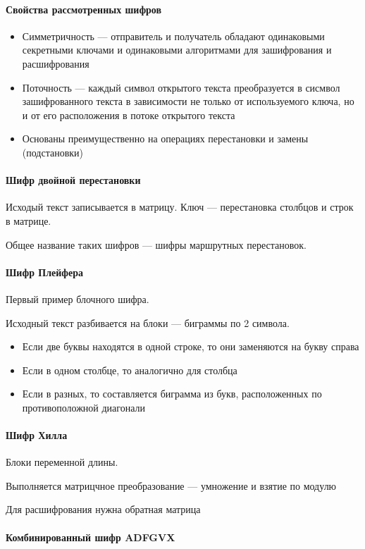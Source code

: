 \documentclass[a4paper, 14pt]{extarticle}
\begin{document}
\paragraph{Свойства рассмотренных шифров}
\begin{itemize}
    \item Симметричность --- отправитель и получатель обладают одинаковыми секретными ключами и одинаковыми алгоритмами для зашифрования и расшифрования
    \item Поточность --- каждый символ открытого текста преобразуется в сисмвол зашифрованного текста в зависимости не только от используемого ключа, но и от его расположения в потоке открытого текста
    \item Основаны преимущественно на операциях перестановки и замены (подстановки)
\end{itemize}

\paragraph{Шифр двойной перестановки}
Исходый текст записывается в матрицу. Ключ --- перестановка столбцов и строк в матрице.

Общее название таких шифров --- шифры маршрутных перестановок.

\paragraph{Шифр Плейфера}
Первый пример блочного шифра. 

Исходный текст разбивается на блоки --- биграммы по 2 символа. 
\begin{itemize}
    \item Если две буквы находятся в одной строке, то они заменяются на букву справа
    \item Если в одном столбце, то аналогично для столбца
    \item Если в разных, то составляется биграмма из букв, расположенных по противоположной диагонали
\end{itemize}

\paragraph{Шифр Хилла}
Блоки переменной длины. 


Выполняется матрицчное преобразование --- умножение и взятие по модулю


Для расшифрования нужна обратная матрица

\paragraph{Комбинированный шифр ADFGVX}
\end{document}
